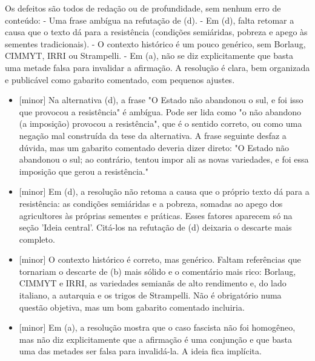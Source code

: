 \documentclass{article}%
\begin{document}
Os defeitos são todos de redação ou de profundidade, sem nenhum erro de conteúdo:\newline%
{-} Uma frase ambígua na refutação de (d).\newline%
{-} Em (d), falta retomar a causa que o texto dá para a resistência (condições semiáridas, pobreza e apego às sementes tradicionais).\newline%
{-} O contexto histórico é um pouco genérico, sem Borlaug, CIMMYT, IRRI ou Strampelli.\newline%
{-} Em (a), não se diz explicitamente que basta uma metade falsa para invalidar a afirmação.\newline%
\newline%
A resolução é clara, bem organizada e publicável como gabarito comentado, com pequenos ajustes.%
\begin{itemize}%
\item%
{[}minor{]} Na alternativa (d), a frase "O Estado não abandonou o sul, e foi isso que provocou a resistência" é ambígua. Pode ser lida como "o não abandono (a imposição) provocou a resistência", que é o sentido correto, ou como uma negação mal construída da tese da alternativa. A frase seguinte desfaz a dúvida, mas um gabarito comentado deveria dizer direto: "O Estado não abandonou o sul; ao contrário, tentou impor ali as novas variedades, e foi essa imposição que gerou a resistência."%
\item%
{[}minor{]} Em (d), a resolução não retoma a causa que o próprio texto dá para a resistência: as condições semiáridas e a pobreza, somadas ao apego dos agricultores às próprias sementes e práticas. Esses fatores aparecem só na seção 'Ideia central'. Citá{-}los na refutação de (d) deixaria o descarte mais completo.%
\item%
{[}minor{]} O contexto histórico é correto, mas genérico. Faltam referências que tornariam o descarte de (b) mais sólido e o comentário mais rico: Borlaug, CIMMYT e IRRI, as variedades semianãs de alto rendimento e, do lado italiano, a autarquia e os trigos de Strampelli. Não é obrigatório numa questão objetiva, mas um bom gabarito comentado incluiria.%
\item%
{[}minor{]} Em (a), a resolução mostra que o caso fascista não foi homogêneo, mas não diz explicitamente que a afirmação é uma conjunção e que basta uma das metades ser falsa para invalidá{-}la. A ideia fica implícita.%
\end{itemize}%
\end{document}
